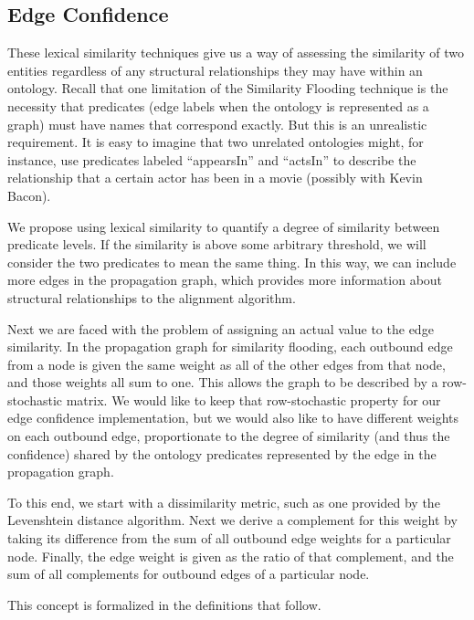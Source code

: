 \documentclass[letterpaper,twocolumn,12pt]{article}
\begin{document}
\subsection{Edge Confidence}
These lexical similarity techniques give us a way of assessing the similarity of two entities regardless of any structural relationships they may have within an ontology. 
Recall that one limitation of the Similarity Flooding technique is the necessity that predicates (edge labels when the ontology is represented as a graph) must have names that correspond exactly. 
But this is an unrealistic requirement. 
It is easy to imagine that two unrelated ontologies might, for instance, use predicates labeled ``appearsIn'' and ``actsIn'' to describe the relationship that a certain actor has been in a movie (possibly with Kevin Bacon).

We propose using lexical similarity to quantify a degree of similarity between predicate levels. 
If the similarity is above some arbitrary threshold, we will consider the two predicates to mean the same thing.
In this way, we can include more edges in the propagation graph, which provides more information about structural relationships to the alignment algorithm.

Next we are faced with the problem of assigning an actual value to the edge similarity. 
In the propagation graph for similarity flooding, each outbound edge from a node is given the same weight as all of the other edges from that node, and those weights all sum to one. 
This allows the graph to be described by a row-stochastic matrix. 
We would like to keep that row-stochastic property for our edge confidence implementation, but we would also like to have different weights on each outbound edge,
proportionate to the degree of similarity (and thus the confidence) shared by the ontology predicates represented by the edge in the propagation graph.

To this end, we start with a dissimilarity metric, such as one provided by the Levenshtein distance algorithm. 
Next we derive a complement for this weight by taking its difference from the sum of all outbound edge weights for a particular node. 
Finally, the edge weight is given as the ratio of that complement, and the sum of all complements for outbound edges of a particular node.

This concept is formalized in the definitions that follow.
\end{document}

